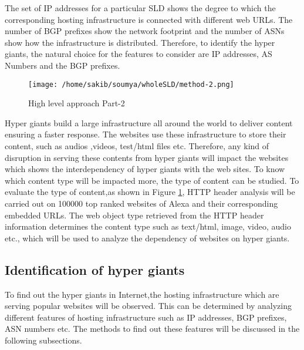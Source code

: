 \noindent The set of IP addresses for a particular SLD shows the degree to which the corresponding hosting infrastructure is connected with different web URLs. The number of BGP prefixes show the network footprint and the number of ASNs show how the infrastructure is distributed. Therefore, to identify the hyper giants, the natural choice for the features to consider are IP addresses, AS Numbers and the BGP prefixes.\\

\begin{figure}[htb]
  \centering
  \texttt{[image: /home/sakib/soumya/wholeSLD/method-2.png]}\\
  \caption{High level approach Part-2}
  \label{fig:app}
\end{figure}

\noindent Hyper giants build a large infrastructure all around the world to deliver content ensuring a faster response. The websites use these infrastructure to store their content, such as audios ,videos, test/html files etc. Therefore, any kind of disruption in serving these contents from hyper giants will impact the websites which shows the interdependency of hyper giants with the web sites. To know which content type will be impacted more, the type of content can be studied. To evaluate the type of content,as shown in Figure \ref{fig:app}, HTTP header analysis will be carried out on 100000 top ranked websites of Alexa and their corresponding embedded URLs. The web object type retrieved from the HTTP header information determines the content type such as text/html, image, video, audio etc., which will be used to analyze the dependency of websites on hyper giants.
\subsection{Identification of hyper giants}
\noindent To find out the hyper giants in Internet,the hosting infrastructure which are serving popular websites will be observed. This can be determined by analyzing different features of hosting infrastructure such as IP addresses, BGP prefixes, ASN numbers etc. The methods to find out these features will be discussed in the following subsections.\\

\clearpage
